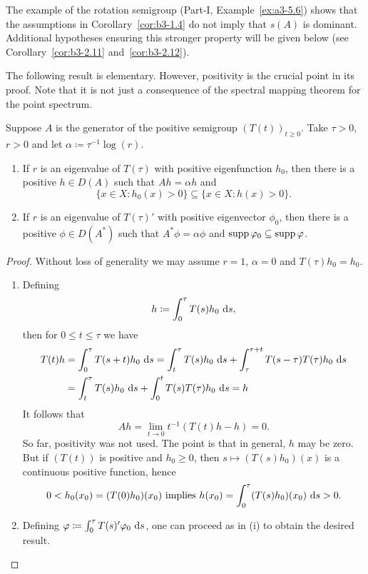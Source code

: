 The example of the rotation semigroup (Part-I, Example~\ref{ex:a3-5.6}) shows that the assumptions in Corollary~\ref{cor:b3-1.4} do not imply that $s(A)$ is dominant.
Additional hypotheses ensuring this stronger property will be given below (see Corollary~\ref{cor:b3-2.11} and~\ref{cor:b3-2.12}).

The following result is elementary. 
However, positivity is the crucial point in its proof. 	
Note that it is not just a consequence of the spectral mapping theorem for the point spectrum.
\begin{proposition}\label{prop:b3-1.5}
Suppose $A$ is the generator of the positive semigroup $(T(t))_{t \geq 0}$.
Take $\tau > 0$, $r > 0$ and let $\alpha \coloneq \tau^{-1}\log(r)$.
\begin{enumerate}[\upshape (i)]
\item 
If\/ $r$ is an eigenvalue of\/ $T(\tau)$ with positive eigenfunction
$h_{0}$, then there is a positive $h \in D(A)$ such that $Ah = \alpha h$ and 
\[
\{x \in X \colon h_{0}(x) > 0\} \subseteq \{x \in X \colon h(x) > 0\} .
\]
		
\item 
If\/ $r$ is an eigenvalue of\/ $T(\tau)'$ with positive eigenvector $\phi_{0}$, then there is a positive $\phi \in D(A^*)$ such that $A^*\phi = \alpha\phi$ and $\supp\phi_{0} \subseteq \supp\phi$.
	\end{enumerate}
\end{proposition}
\begin{proof}
	Without loss of generality we may assume $r = 1$, \ie $\alpha = 0$ and $T(\tau)h_{0} = h_{0}$.
	\begin{enumerate}[\upshape (i), wide, labelindent=.25em]
    \item 
	Defining
	\begin{equation}\label{eq:b3-1.14}
		h \coloneq \int_{0}^{\tau} T(s)h_{0} \, \mathop{}\!\mathrm{d}{s}  , 
	\end{equation}
	then for $0 \leq t \leq \tau$ we have
	\begin{align*}
		T(t)h &= \int_{0}^{\tau} T(s+t)h_{0} \, \mathop{}\!\mathrm{d}{s}  = \int_{t}^{\tau} T(s)h_{0} \, \mathop{}\!\mathrm{d}{s}  + \int_{\tau}^{\tau+t} T(s-\tau)T(\tau)h_{0} \, \mathop{}\!\mathrm{d}{s}  \\
		&= \int_{t}^{\tau} T(s)h_{0} \, \mathop{}\!\mathrm{d}{s}  + \int_{0}^{t} T(s)T(\tau)h_{0} \, \mathop{}\!\mathrm{d}{s}  = h
	\end{align*}
	It follows that 
    \[
    Ah = \lim_{t \to 0} t^{-1}(T(t)h - h) = 0 .
    \]
	So far, positivity was not used. 
    The point is that in general, $h$ may be zero.
	But if\/ $(T(t))$ is positive and $h_{0} \geq 0$, then $s \mapsto (T(s)h_{0})(x)$ is a continuous positive function, hence 
    \[
    0 < h_{0}(x_{0}) = (T(0)h_{0})(x_{0}) \text{ implies } h(x_{0}) = \int_{0}^{\tau} (T(s)h_{0})(x_{0}) \, \mathop{}\!\mathrm{d}{s}  > 0 .
    \]
	\item 
	Defining $\phi \coloneq \int_{0}^{\tau} T(s)'\phi_{0} \, \ds $, one can proceed as in (i) to obtain the desired result.
	\qedhere
	\end{enumerate}
\end{proof}
